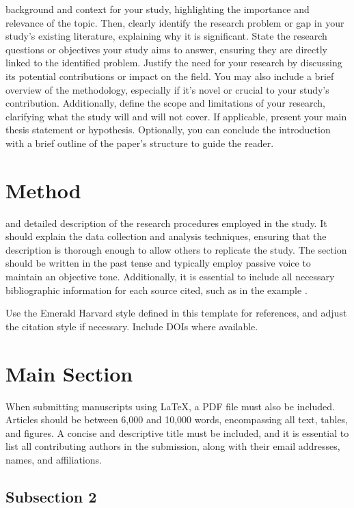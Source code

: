 \documentclass{article}
\begin{document}
background and context for your study, highlighting the importance and relevance of the topic. 
Then, clearly identify the research problem or gap in your study's existing literature, explaining why it is significant. 
State the research questions or objectives your study aims to answer, ensuring they are directly linked to the identified problem. 
Justify the need for your research by discussing its potential contributions or impact on the field.
You may also include a brief overview of the methodology, especially if it's novel or crucial to your study's contribution. 
Additionally, define the scope and limitations of your research, clarifying what the study will and will not cover.
If applicable, present your main thesis statement or hypothesis. 
Optionally, you can conclude the introduction with a brief outline of the paper's structure to guide the reader.

\section{Method}
\label{sec:method}and detailed description of the research procedures employed in the study. 
It should explain the data collection and analysis techniques, ensuring that the description is thorough enough to allow others to replicate the study. 
The section should be written in the past tense and typically employ passive voice to maintain an objective tone. 
Additionally, it is essential to include all necessary bibliographic information for each source cited, such as in the example \cite{fellows_research_2021}.

Use the Emerald Harvard style defined in this template for references, and adjust the citation style if necessary. Include DOIs where available. 

\section{Main Section}
\label{sec:main_section}
When submitting manuscripts using \LaTeX, a PDF file must also be included. 
Articles should be between 6,000 and 10,000 words, encompassing all text, tables, and figures. 
A concise and descriptive title must be included, and it is essential to list all contributing authors in the submission, along with their email addresses, names, and affiliations.




\subsection{Subsection 2}
\end{document}
